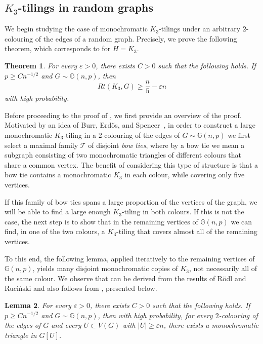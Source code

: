 \documentclass[a4paper,reqno,11pt]{amsart}
\newtheorem{theorem}{Theorem}[section]
\newtheorem{lemma}[theorem]{Lemma}
\theoremstyle{definition}
\theoremstyle{remark}
\renewcommand\geq{\geqslant}
\begin{document}
\subsection{$K_3$-tilings in random graphs} We begin studying the case of monochromatic $K_3$-tilings under an arbitrary $2$-colouring of the edges of a random graph. Precisely, we prove the following theorem, which corresponds to  for $H = K_3$.

\begin{theorem}\label{thm:trianglelower}
For every $\varepsilon>0$, there exists $C>0$ such that the following holds. If $p \geq Cn^{-1/2}$ and $G\sim \mathbb{G}(n,p)$, then
\begin{equation*}
    Rt(K_3,G)\geq \frac{n}{5}-\varepsilon n
\end{equation*}
with high probability.
\end{theorem}

Before proceeding to the proof of , we first provide an overview of the proof. Motivated by an idea of Burr, Erd\H{o}s, and Spencer~\cite{BES}, in order to construct a large monochromatic $K_3$-tiling in a $2$-colouring of the edges of $G \sim \mathbb{G}(n,p)$ we first select a maximal family $\mathcal{T}$ of disjoint \emph{bow ties}, where by a bow tie we mean a subgraph consisting of two monochromatic triangles of different colours that share a common vertex. The benefit of considering this type of structure is that a bow tie contains a monochromatic $K_3$ in each colour, while covering only five vertices.

If this family of bow ties spans a large proportion of the vertices of the graph, we will be able to find a large enough $K_3$-tiling in both colours. If this is not the case, the next step is to show that in the remaining vertices of $\mathbb{G}(n,p)$ we can find, in one of the two colours, a $K_3$-tiling that covers almost all of the remaining vertices.

To this end, the following lemma, applied iteratively to the remaining vertices of $\mathbb{G}(n,p)$, yields many disjoint monochromatic copies of $K_3$, not necessarily all of the same colour. We observe that  can be derived from the results of R\"{o}dl and Ruci\'{n}ski \cite{RR93, RR94, RR95} and also follows from , presented below.

\begin{lemma}\label{lem:trianglesup}
For every $\varepsilon>0$, there exists $C>0$ such that the following holds. If $p \geq Cn^{-1/2}$ and $G\sim \mathbb{G}(n,p)$, then with high probability, for every $2$-colouring of the edges of $G$ and every $U\subset V(G)$ with $|U|\geq \varepsilon n$, there exists a monochromatic triangle in $G[U]$.
\end{lemma}
\end{document}
